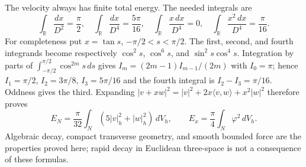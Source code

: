The velocity always has finite total energy. The needed integrals are
\begin{equation}\label{eq:wb-integrals}
 \int_{\mathbb R}\frac{dx}{D^2}=\frac\pi2,\quad
 \int_{\mathbb R}\frac{dx}{D^4}=\frac{5\pi}{16},\quad
 \int_{\mathbb R}\frac{x\,dx}{D^4}=0,\quad
 \int_{\mathbb R}\frac{x^2\,dx}{D^4}=\frac\pi{16}.
\end{equation}
For completeness put $x=\tan s$, $-\pi/2<s<\pi/2$.
The first, second, and fourth integrands become respectively
$\cos^2s$, $\cos^6s$, and $\sin^2s\cos^4s$.
Integration by parts of $\int_{-\pi/2}^{\pi/2}\cos^{2m}s\,ds$
gives $I_m=(2m-1)I_{m-1}/(2m)$ with $I_0=\pi$;
hence $I_1=\pi/2$, $I_2=3\pi/8$, $I_3=5\pi/16$ and
the fourth integral is $I_2-I_3=\pi/16$. Oddness gives the third.
Expanding $|v+xw|^2=|v|^2+2x\langle v,w\rangle+x^2|w|^2$
therefore proves
\begin{equation}\label{eq:wb-exact-energy}
 E_N=\frac\pi{32}\int_N(5|v|_h^2+|w|_h^2)\,dV_h,
 \qquad E_x=\frac\pi4\int_N\varphi^2\,dV_h.
\end{equation}
Algebraic decay, compact transverse geometry, and smooth bounded force
are the properties proved here; rapid decay in Euclidean three-space
is not a consequence of these formulas.


